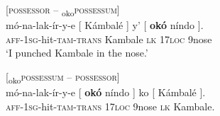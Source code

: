 \documentclass[output=paper]{langscibook}
\begin{document}
\ea \label{ex:schneider:ExternalPossession}
\begin{xlist}

\ex \label{ex:schneider:OKOPossessumFollowsPossessor}
[\textsc{possessor} – \textsubscript{oko}\textsc{possessum}]\\
\gll m\'o-na-lak-ír-y-e [ Kámbal\'e ] y' [ \textbf{ok\'o} níndo ].  \\
\textsc{aff-1sg}-hit-\textsc{tam-trans} {} Kambale {} \textsc{lk} {} \textsc{17loc} 9nose {} \\
\glt `I punched Kambale in the nose.' 

\ex \label{ex:schneider:OKOPossessumCannotPrecedePossessor}
[\textsubscript{oko}\textsc{possessum} – \textsc{possessor}]\\
\gll *m\'o-na-lak-ír-y-e [ \textbf{ok\'o} níndo ] ko [ Kámbal\'e ].  \\
\textsc{aff-1sg}-hit-\textsc{tam-trans} {} \textsc{17loc} 9nose {} \textsc{lk} {} Kambale. {}  \\

\end{xlist}
\end{document}

